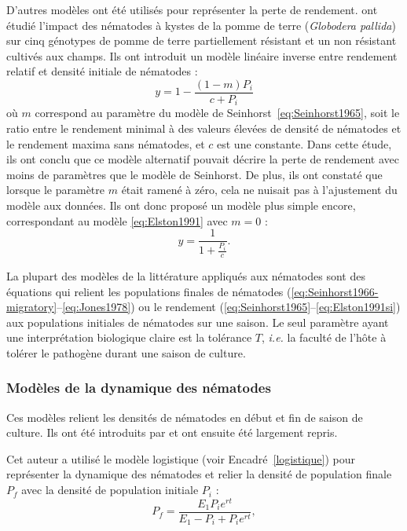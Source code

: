 	D'autres modèles ont été utilisés pour représenter la perte de rendement. \citet{Elston1991} ont étudié l'impact des nématodes à kystes de la pomme de terre (\textit{Globodera pallida}) sur cinq génotypes de pomme de terre partiellement résistant et un non résistant cultivés aux champs. Ils ont introduit un modèle linéaire inverse entre rendement relatif et densité initiale de nématodes : 
	\begin{equation}
		y = 1 - \frac{(1-m) P_i}{c + P_i}
		\label{eq:Elston1991}
	\end{equation}
	où $m$ correspond au paramètre du modèle de Seinhorst~\eqref{eq:Seinhorst1965}, soit le ratio entre le rendement minimal à des valeurs élevées de densité de nématodes et le rendement maxima sans nématodes, et $c$ est une constante. Dans cette étude, ils ont conclu que ce modèle alternatif pouvait décrire la perte de rendement avec moins de paramètres que le modèle de Seinhorst. 
	De plus, ils ont constaté que lorsque le paramètre $m$ était ramené à zéro,  cela ne nuisait pas à l'ajustement du modèle aux données.  Ils ont donc  proposé un modèle  plus simple encore, correspondant au modèle \eqref{eq:Elston1991} avec $m=0$ :
	\begin{equation}
		y =\frac{1}{1 + \frac{P_i}{c}}.
		\label{eq:Elston1991si}
	\end{equation}
	
	\medskip
	La plupart des modèles  de la littérature appliqués aux nématodes sont  des équations  qui relient les  populations finales de nématodes (\ref{eq:Seinhorst1966-migratory}--\ref{eq:Jones1978}) ou le rendement (\ref{eq:Seinhorst1965}--\ref{eq:Elston1991si}) aux populations initiales de nématodes sur une saison. Le seul paramètre ayant une  interprétation biologique claire est la tolérance $T$, \textit{i.e.} la faculté de l'hôte à tolérer le pathogène durant une saison de culture. 
	
	
	\subsubsection{Modèles de la dynamique des nématodes}
	
	Ces modèles relient les densités de nématodes en début et fin de saison de culture. Ils ont été introduits par \citet{Seinhorst1966,Seinhorst1967a,Seinhorst1967b,Seinhorst1967c,Seinhorst1970} et ont ensuite été largement repris.
	
	
	Cet auteur a utilisé le modèle logistique (voir Encadré~\ref{logistique}) pour représenter la dynamique des nématodes et relier la densité de population finale $P_f$ avec la densité de population initiale $P_i$ :
	\begin{equation}
	  P_f =  \frac{E_1 P_i e^{rt}}{ E_1 - P_i + P_i e^{rt}},
	  \label{eq:Seinhorst1966-migratory}
	\end{equation}
	
